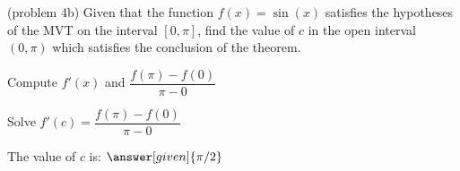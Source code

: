\documentclass{ximera}
\begin{document}
\begin{problem}(problem 4b)
  Given that the function $f(x) = \sin(x)$ satisfies the hypotheses of the MVT on the
	interval $[0, \pi]$, find the value of $c$ in the open interval $(0, \pi)$ which satisfies 
	the conclusion of the theorem.
	
    \begin{hint}
      Compute $f'(x)$ and $\dfrac{f(\pi) - f(0)}{\pi - 0}$
    \end{hint}
		\begin{hint}
		  Solve $f'(c) = \dfrac{f(\pi) - f(0)}{\pi - 0}$
		\end{hint}
		
		The value of $c$ is:
		 $\answer[given]{\pi /2}$
\end{problem}

\begin{center}
\begin{foldable}
\end{foldable}
\end{center}
\end{document}
